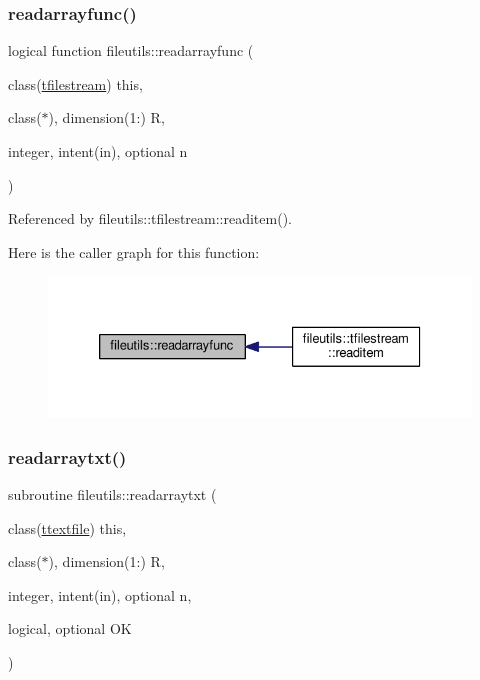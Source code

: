 \mbox{\label{namespacefileutils_a25c117441044cad4593a6e88245d59d2}} 
\subsubsection{\texorpdfstring{readarrayfunc()}{readarrayfunc()}}
{\footnotesize\ttfamily logical function fileutils\+::readarrayfunc (\begin{DoxyParamCaption}\item[{class(\mbox{\hyperlink{structfileutils_1_1tfilestream}{tfilestream}})}]{this,  }\item[{class($\ast$), dimension(1\+:)}]{R,  }\item[{integer, intent(in), optional}]{n }\end{DoxyParamCaption})\hspace{0.3cm}{\ttfamily [private]}}



Referenced by fileutils\+::tfilestream\+::readitem().

Here is the caller graph for this function\+:
\nopagebreak
\begin{figure}[H]
\begin{center}
\leavevmode
\includegraphics[width=330pt]{namespacefileutils_a25c117441044cad4593a6e88245d59d2_icgraph}
\end{center}
\end{figure}
\mbox{\label{namespacefileutils_a580904418c96464193ec145fd077c14b}} 
\subsubsection{\texorpdfstring{readarraytxt()}{readarraytxt()}}
{\footnotesize\ttfamily subroutine fileutils\+::readarraytxt (\begin{DoxyParamCaption}\item[{class(\mbox{\hyperlink{structfileutils_1_1ttextfile}{ttextfile}})}]{this,  }\item[{class($\ast$), dimension(1\+:)}]{R,  }\item[{integer, intent(in), optional}]{n,  }\item[{logical, optional}]{OK }\end{DoxyParamCaption})\hspace{0.3cm}{\ttfamily [private]}}

